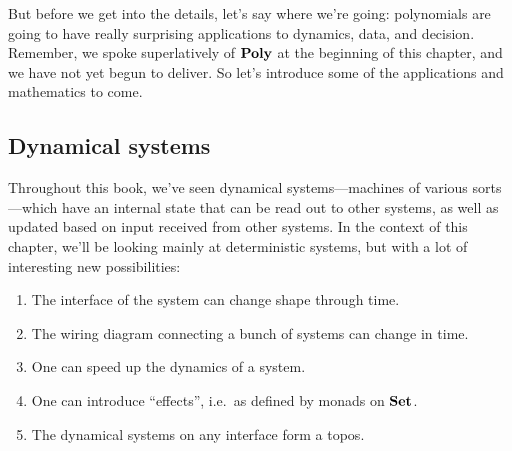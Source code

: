 \documentclass[DynamicalBook]{subfiles}
\begin{document}
But before we get into the details, let's say where we're going: polynomials are going to have really surprising applications to dynamics, data, and decision. Remember, we spoke superlatively of $\mathbf{Poly}$ at the beginning of this chapter,
and we have not yet begun to deliver. So let's introduce some of the applications and mathematics to come.

\subsection{Dynamical systems}

Throughout this book, we've seen dynamical systems---machines of various sorts---which have an internal state that can be read out to other systems, as well as updated based on input received from other systems. In the context of this chapter, we'll be looking mainly at deterministic systems, but with a lot of interesting new possibilities:
\begin{enumerate}
	\item The interface of the system can change shape through time.
	\item The wiring diagram connecting a bunch of systems can change in time.
	\item One can speed up the dynamics of a system.
	\item One can introduce ``effects'', i.e.\ as defined by monads on $\mathbf{Set}$.
	\item The dynamical systems on any interface form a topos.
\end{enumerate}
\end{document}
